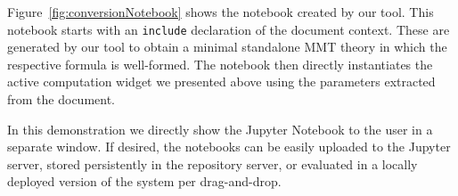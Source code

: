 Figure~\ref{fig:conversionNotebook} shows the notebook created by our tool.
This notebook starts with an \texttt{include} declaration of the document context. 
These are generated by our tool to obtain a minimal standalone MMT theory in which the respective formula is well-formed. 
The notebook then directly instantiates the active computation widget we presented above using the parameters extracted from the document. 

In this demonstration we directly show the Jupyter Notebook to the user in a separate window. 
If desired, the notebooks can be easily uploaded to the Jupyter server, stored persistently in the repository server, or evaluated in a locally deployed version of the system per drag-and-drop.


